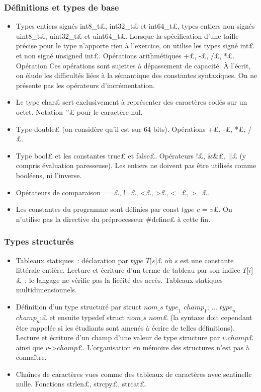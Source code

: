\subsubsection*{Définitions et types de base}
\begin{itemize}
\item Types entiers signés \£int8_t£, \£int32_t£ et \£int64_t£, types entiers
    non signés \£uint8_t£, \£uint32_t£ et \£uint64_t£. Lorsque la spécification d'une taille précise pour le type n'apporte rien à l'exercice, on utilise les types signé \£int£ et non signé \£unsigned int£. Opérations arithmétiques \£+£, \£-£, \£/£, \£*£. Opération \£%
Ces opérations sont sujettes à dépassement de capacité. À l'écrit, on élude les difficultés liées à la sémantique des constantes syntaxiques. On ne présente pas les opérateurs d'incrémentation.
\item Le type \£char£ sert exclusivement à représenter des caractères codés sur un octet. Notation \£'\0'£ pour le caractère nul.
\item Type \£double£ (on considère qu'il est sur 64 bits). Opérations \£+£, \£-£, \£*£, \£/£.
\item Type \£bool£ et les constantes \£true£ et \£false£. Opérateurs \£!£, \£&&£, \£||£ (y compris évaluation paresseuse). Les entiers ne doivent pas être utilisés comme booléens, ni l'inverse.
\item Opérateurs de comparaison \£==£, \£!=£, \£<£, \£>£, \£<=£, \£>=£.
\item Les constantes du programme sont définies par \£const $\mathit{type}$ $c$ = $v$£. On n'utilise pas la directive du préprocesseur \£#define£ à cette fin.
\end{itemize}

\subsubsection*{Types structurés}
\begin{itemize}
\item Tableaux statiques~: déclaration par \£$\mathit{type}$ $T$[$s$]£ où $s$ est une constante littérale entière. Lecture et écriture d'un terme de tableau par son indice \£$T$[$i$]£~; le langage ne vérifie pas la licéité des accès. Tableaux statiques multidimensionnels.
\item Définition d'un type structuré par \£struct $\mathit{nom\_s}$ {$\mathit{type}_1$ $\mathit{champ}_1$; $\dots$ $\mathit{type}_n$ $\mathit{champ}_n$;}£ et ensuite \£typedef struct $\mathit{nom\_s}$ $\mathit{nom}$£ (la syntaxe doit cependant être rappelée si les étudiants sont amenés à écrire de telles définitions). Lecture et écriture d'un champ d'une valeur de type structure par \£$v$.$\mathit{champ}$£ ainsi que \£$v$->$\mathit{champ}$£. L'organisation en mémoire des structures n'est pas à connaître.
\item Chaînes de caractères vues comme des tableaux de caractères avec sentinelle nulle. Fonctions \£strlen£, \£strcpy£, \£strcat£.
\end{itemize}

